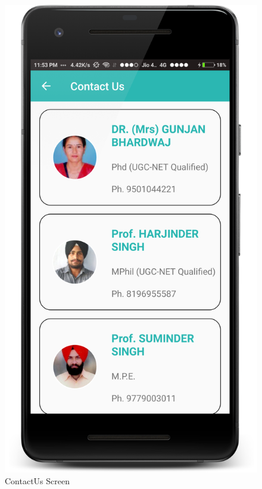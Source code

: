 \begin{figure}[ht]
\centering
\includegraphics[scale=0.20]{images/S8.png}
\caption{ContactUs Screen}
\end{figure}

\newpage


